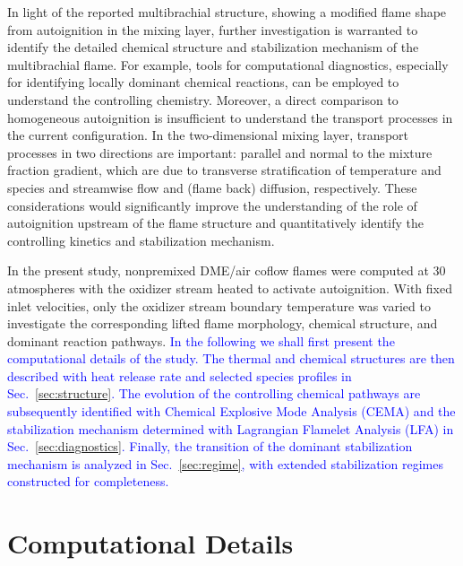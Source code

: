 \documentclass[review,3p,times]{elsarticle}
\begin{document}
In light of the reported multibrachial structure, showing a modified flame shape from autoignition in the mixing layer, further investigation is warranted to identify the detailed chemical structure and stabilization mechanism of the multibrachial flame.  For example, tools for computational diagnostics, especially for identifying locally dominant chemical reactions, can be employed to understand the controlling chemistry.  Moreover, a direct comparison to homogeneous autoignition is insufficient to understand the transport processes in the current configuration.  In the two-dimensional mixing layer, transport processes in two directions are important: parallel and normal to the mixture fraction gradient, which are due to transverse stratification of temperature and species and streamwise flow and (flame back) diffusion, respectively.  These considerations would significantly improve the understanding of the role of autoignition upstream of the flame structure and quantitatively identify the controlling kinetics and stabilization mechanism.     

In the present study, nonpremixed DME/air coflow flames were computed at $30$ atmospheres with the oxidizer stream heated to activate autoignition.  With fixed inlet velocities, only the oxidizer stream boundary temperature was varied to investigate the corresponding lifted flame morphology, chemical structure, and dominant reaction pathways.  \textcolor{blue}{In the following we shall first present the computational details of the study.  The thermal and chemical structures are then described with heat release rate and selected species profiles in Sec.~\ref{sec:structure}.  The evolution of the controlling chemical pathways are subsequently identified with Chemical Explosive Mode Analysis (CEMA) and the stabilization mechanism determined with Lagrangian Flamelet Analysis (LFA) in Sec.~\ref{sec:diagnostics}.  Finally, the transition of the dominant stabilization mechanism is analyzed in Sec.~\ref{sec:regime}, with extended stabilization regimes constructed for completeness.}

 

\section{Computational Details} \label{sec:computation}
\end{document}
